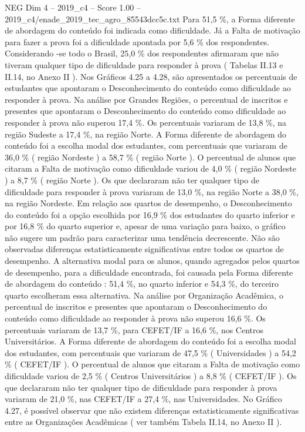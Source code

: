 \begin{textsample}{NEG Dim 4 – 2019\_c4 – Score 1.00 – 2019\_c4/enade\_2019\_tec\_agro\_85543dcc5c.txt}
Para 51,5 \%, a Forma diferente de abordagem do conteúdo foi indicada como dificuldade.
Já a Falta de motivação para fazer a prova foi a dificuldade apontada por 5,6 \% dos respondentes.
Considerando -se todo o Brasil, 25,0 \% dos respondentes afirmaram que não tiveram qualquer tipo de dificuldade para responder à prova ( Tabelas II.13 e II.14, no Anexo II ).
Nos Gráficos 4.25 a 4.28, são apresentados os percentuais de estudantes que apontaram o Desconhecimento do conteúdo como dificuldade ao responder à prova.
Na análise por Grandes Regiões, o percentual de inscritos e presentes que apontaram o Desconhecimento do conteúdo como dificuldade ao responder à prova não superou 17,4 \%.
Os percentuais variaram de 13,8 \%, na região Sudeste a 17,4 \%, na região Norte.
A Forma diferente de abordagem do conteúdo foi a escolha modal dos estudantes, com percentuais que variaram de 36,0 \% ( região Nordeste ) a 58,7 \% ( região Norte ).
O percentual de alunos que citaram a Falta de motivação como dificuldade variou de 4,0 \% ( região Nordeste ) a 8,7 \% ( região Norte ).
Os que declararam não ter qualquer tipo de dificuldade para responder à prova variaram de 13,0 \%, na região Norte a 38,0 \%, na região Nordeste.
Em relação aos quartos de desempenho, o Desconhecimento do conteúdo foi a opção escolhida por 16,9 \% dos estudantes do quarto inferior e por 16,8 \% do quarto superior e, apesar de uma variação para baixo, o gráfico não sugere um padrão para caracterizar uma tendência decrescente.
Não são observadas diferenças estatisticamente significativas entre todos os quartos de desempenho.
A alternativa modal para os alunos, quando agregados pelos quartos de desempenho, para a dificuldade encontrada, foi causada pela Forma diferente de abordagem do conteúdo : 51,4 \%, no quarto inferior e 54,3 \%, do terceiro quarto escolheram essa alternativa.
Na análise por Organização Acadêmica, o percentual de inscritos e presentes que apontaram o Desconhecimento do conteúdo como dificuldade ao responder à prova não superou 16,6 \%.
Os percentuais variaram de 13,7 \%, para CEFET/IF a 16,6 \%, nos Centros Universitários.
A Forma diferente de abordagem do conteúdo foi a escolha modal dos estudantes, com percentuais que variaram de 47,5 \% ( Universidades ) a 54,2 \% ( CEFET/IF ).
O percentual de alunos que citaram a Falta de motivação como dificuldade variou de 2,5 \% ( Centros Universitários ) a 8,8 \% ( CEFET/IF ).
Os que declararam não ter qualquer tipo de dificuldade para responder à prova variaram de 21,0 \%, nas CEFET/IF a 27,4 \%, nas Universidades.
No Gráfico 4.27, é possível observar que não existem diferenças estatisticamente significativas entre as Organizações Acadêmicas ( ver também Tabela II.14, no Anexo II ).

\end{textsample}
